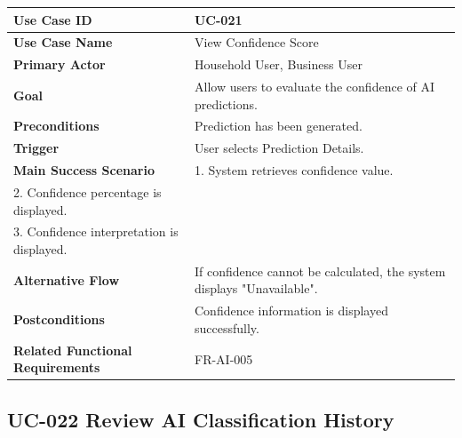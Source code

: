 \begin{longtable}{|p{4cm}|p{10cm}|}

\hline
\textbf{Use Case ID} &
UC-021 \\
\hline

\textbf{Use Case Name} &
View Confidence Score \\
\hline

\textbf{Primary Actor} &
Household User, Business User \\
\hline

\textbf{Goal} &
Allow users to evaluate the confidence of AI predictions. \\
\hline

\textbf{Preconditions} &
Prediction has been generated. \\
\hline

\textbf{Trigger} &
User selects Prediction Details. \\
\hline

\textbf{Main Success Scenario} &
1. System retrieves confidence value.\\
2. Confidence percentage is displayed.\\
3. Confidence interpretation is displayed.\\
\hline

\textbf{Alternative Flow} &
If confidence cannot be calculated, the system displays "Unavailable".\\
\hline

\textbf{Postconditions} &
Confidence information is displayed successfully.\\
\hline

\textbf{Related Functional Requirements} &
FR-AI-005 \\
\hline

\end{longtable}

\subsection{UC-022 Review AI Classification History}

